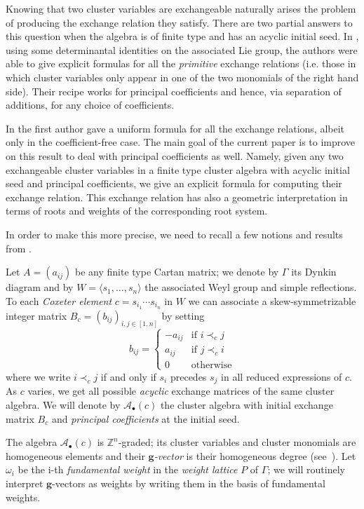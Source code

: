 \documentclass[11pt]{amsart}
\newcommand{\cA}{\mathcal{A}}
\newcommand{\ZZ}{\mathbb{Z}}
\newcommand{\bg}{\mathbf{g}}
\theoremstyle{definition}
\numberwithin{equation}{section}
\numberwithin{figure}{section}
\begin{document}
  Knowing that two cluster variables are exchangeable naturally arises the problem of producing the exchange relation they satisfy.
  There are two partial answers to this question when the algebra is of finite type and has an acyclic initial seed.
  In \cite{YZ08}, using some determinantal identities on the associated Lie group, the authors were able to give explicit formulas for all the \emph{primitive} exchange relations (i.e. those in which cluster variables only appear in one of the two monomials of the right hand side).
  Their recipe works for principal coefficients and hence, via separation of additions, for any choice of coefficients.

  In \cite{Ste13} the first author gave a uniform formula for all the exchange relations, albeit only in the coefficient-free case.
  The main goal of the current paper is to improve on this result to deal with principal coefficients as well.
  Namely, given any two exchangeable cluster variables in a finite type cluster algebra with acyclic initial seed and principal coefficients, we give an explicit formula for computing their exchange relation.
  This exchange relation has also a geometric interpretation in terms of roots and weights of the corresponding root system.


  In order to make this more precise, we need to recall a few notions and results from \cite{Ste13,YZ08}.

  Let $A=(a_{ij})$ be any finite type Cartan matrix; we denote by $\Gamma$ its Dynkin diagram and by $W=\langle s_1,\dots,s_n\rangle$ the associated Weyl group and simple reflections.
  To each \emph{Coxeter element} $c=s_{i_1}\cdots s_{i_n}$ in $W$ we can associate a skew-symmetrizable integer matrix $B_c=(b_{ij})_{i,j\in[1,n]}$ by setting
  \[
    b_{ij}=
    \begin{cases}
      -a_{ij} & \text{if } i\prec_c j  \\
      a_{ij}  & \text{if } j\prec_c i  \\
      0       & \text{otherwise}
    \end{cases}
  \]
  where we write $i\prec_c j$ if and only if $s_i$ precedes $s_j$ in all reduced expressions of $c$.
  As $c$ varies, we get all possible \emph{acyclic} exchange matrices of the same cluster algebra.
  We will denote by $\cA_\bullet(c)$ the cluster algebra with initial exchange matrix $B_c$ and  \emph{principal coefficients} at the initial seed.

  The algebra $\cA_\bullet(c)$ is $\ZZ^n$-graded; its cluster variables and cluster monomials are homogeneous elements and their \emph{$\bg$-vector} is their homogeneous degree (see~\cite[Section~6]{FZ07}).
  Let $\omega_i$ be the i-th \emph{fundamental weight} in the \emph{weight lattice} $P$ of $\Gamma$; we will routinely interpret $\bg$-vectors as weights by writing them in the basis of fundamental weights.
\end{document}
